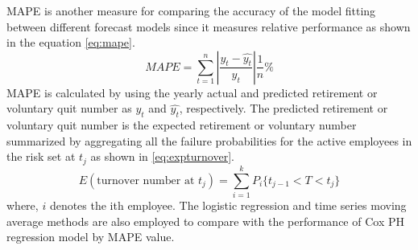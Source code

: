 \documentclass[12pt,letterpaper]{article}
\begin{document}
MAPE is another measure for comparing the accuracy of the model fitting between different forecast models since it measures relative performance \citep{chu1998} as shown in the equation \ref{eq:mape}.
\begin{equation}
	\label{eq:mape}
	MAPE=\sum_{t=1}^{n}\left | \frac{y_t-\hat{y_t}}{y_t} \right |\frac{1}{n}\%
\end{equation}
MAPE is calculated by using the yearly actual and predicted retirement or voluntary quit number as $y_t$ and $\hat{y_t}$, respectively.
The predicted retirement or voluntary quit number is the expected retirement or voluntary number summarized by aggregating all the failure probabilities for the active employees in the risk set at $t_j$ as shown in \ref{eq:expturnover}.
\begin{equation}
\label{eq:expturnover}
E(\text{turnover number at } t_j)=\sum_{i=1}^k{P_i\{t_{j-1}<T<t_j\}}
\end{equation}
where, $i$ denotes the ith employee.
The logistic regression and time series moving average methods are also employed to compare with the  performance of Cox PH regression model by MAPE value.



%
\end{document}
